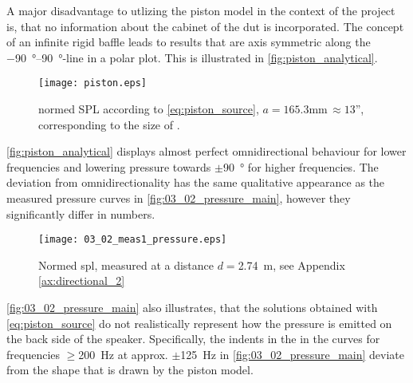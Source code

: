 A major disadvantage to utlizing the piston model in the context of the project is, that no information about the cabinet of the \gls{dut} is incorporated. The concept of an infinite rigid baffle leads to results that are axis symmetric along the \SIrange{-90}{90}{\degree}-line in a polar plot. This is illustrated in \autoref{fig:piston_analytical}.
\begin{figure}[H]
	\centering
	\texttt{[image: piston.eps]}
	\caption{normed SPL according to \autoref{eq:piston_source}, $a=165.3$\si{\milli\meter}$\,\approx 13$'', corresponding to the size of \citep{seas33}.}
		\label{fig:piston_analytical}
\end{figure}
\autoref{fig:piston_analytical} displays almost perfect omnidirectional behaviour for lower frequencies and lowering pressure towards $\pm$\SI{90}{\degree} for higher frequencies. The deviation from omnidirectionality has the same qualitative appearance as the measured pressure curves in \autoref{fig:03_02_pressure_main}, however they significantly differ in numbers.
\begin{figure}[htbp]
	\centering
	\texttt{[image: 03\_02\_meas1\_pressure.eps]}
	\caption{Normed \gls{spl}, measured at a distance \(d=\)\SI{2.74}{\meter}, see Appendix \ref{ax:directional_2}}
		\label{fig:03_02_pressure_main}
\end{figure}
\autoref{fig:03_02_pressure_main} also illustrates, that the solutions obtained with \autoref{eq:piston_source} do not realistically represent how the pressure is emitted on the back side of the speaker. Specifically, the indents in the in the curves for frequencies $\ge$\SI{200}{\hertz} at approx. $\pm$\SI{125}{\hertz} in \autoref{fig:03_02_pressure_main} deviate from the shape that is drawn by the piston model.


    
